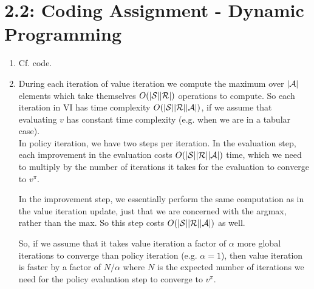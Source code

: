 \documentclass{article}
\begin{document}
\section*{2.2: Coding Assignment - Dynamic Programming}
\begin{enumerate}[label*=\arabic*.]
\item
Cf. code.

\item

During each iteration of value iteration we compute the maximum over $|\cal A|$ elements which take themselves $O(|\cal S||\cal R|)$ operations to compute. So each iteration in VI has time complexity $O(|\cal S||\cal R||\cal A|)$, if we assume that evaluating $v$ has constant time complexity (e.g. when we are in a tabular case). \\[4mm]

In policy iteration, we have two steps per iteration.
In the evaluation step, each improvement in the evaluation costs $O( |\cal S||\cal R||\cal A|)$ time, which we need to multiply by the number of iterations it takes for the evaluation to converge to $v^\pi$.

In the improvement step, we essentially perform the same computation as in the value iteration update, just that we are concerned with the argmax, rather than the max. So this step costs $O(|\cal S||\cal R||\cal A|)$ as well.

So, if we assume that it takes value iteration a factor of $\alpha$ more global iterations to converge than policy iteration (e.g. $\alpha = 1$), then value iteration is faster by a factor of $N/\alpha$ where $N$ is the expected number of iterations we need for the policy evaluation step to converge to $v^\pi$.

\end{enumerate}
\end{document}
